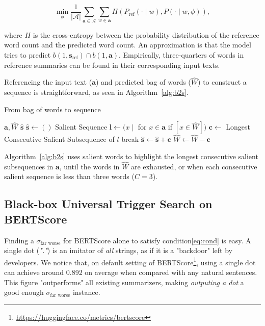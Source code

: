 \documentclass[11pt]{article}
\newcommand{\abs}[1]{\left\lvert#1\right\rvert}
\theoremstyle{remark}
\begin{document}
\begin{equation}\label{eq:train}
\min_\phi \frac{1}{\abs{\mathcal{A}}}\sum _{\mathbf{a}\in \mathcal{A}} \sum _{w\in  \mathbf{a}} H(P_\text{ref}(\cdot\mid w), P(\cdot\mid w, \phi)),
\end{equation}


where $H$ is the cross-entropy between the probability distribution of the reference word count and the predicted word count. An approximation is that the model tries to predict $b(1, \mathbf{s}_\text{ref})\cap b(1, \mathbf{a})$. Empirically, three-quarters of words in reference summaries can be found in their corresponding input texts.

Referencing the input text ($\mathbf{a}$) and predicted bag of words ($\hat{W}$) to construct a sequence is straightforward, as seen in Algorithm~\ref{alg:b2s}.


\begin{algorithm}
\caption{From bag of words to sequence}\label{alg:b2s}
\small
\begin{algorithmic}
\Require $\mathbf{a}, \hat{W}$
\Return $\hat{\mathbf{s}}$
\State $\hat{\mathbf{s}} \gets ()$
\While{$\abs{\hat{W}} > 0$}
\State Salient Sequence $\mathbf{l} \gets (x \mid $ for $x \in \mathbf{a}$ if $[x \in \hat{W}])$
\State $\mathbf{c} \gets$ Longest Consecutive Salient Subsequence of $l$
\If{$\abs{\mathbf{c}} < C$} 
\State break 
\EndIf
\State $\hat{\mathbf{s}} \gets \hat{\mathbf{s}} + \mathbf{c}$ 
\State $\hat{W} \gets \hat{W} - \mathbf{c}$ 

\EndWhile
\end{algorithmic}
\end{algorithm}

Algorithm~\ref{alg:b2s} uses salient words to highlight the longest consecutive salient subsequences in $\mathbf{a}$, until the words in $\hat{W}$ are exhausted, or when each consecutive salient sequence is less than three words ($C=3$). 


\subsection{Black-box Universal Trigger Search on BERTScore}
Finding a $\sigma_\text{far worse}$ for BERTScore alone to satisfy condition\ref{eq:cond} is easy. A single dot (\emph{"."}) is an imitator of \emph{all} strings, as if it is a "backdoor" left by developers. We notice that, on default setting of BERTScore\footnote{\url{https://huggingface.co/metrics/bertscore}}, using a single dot can achieve around 0.892 on average when compared with any natural sentences. This figure "outperforms" all existing summarizers, making \textit{outputing a dot} a good enough $\sigma_\text{far worse}$ instance.
\end{document}
